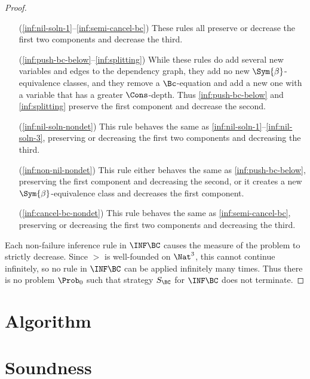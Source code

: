 \begin{proof}
    \begin{itemize}[align=left]
        \item[(\ref{inf:nil-soln-1}--\ref{inf:semi-cancel-bc})] These rules all
            preserve or decrease the first two components and decrease the
            third.

        \item[(\ref{inf:push-bc-below}--\ref{inf:splitting})] While these rules
            do add several new variables and edges to the dependency graph,
            they add no new $\Sym{\beta}$-equivalence classes, and they remove
            a $\Bc$-equation and add a new one with a variable that has a
            greater $\Cons$-depth. Thus \ref{inf:push-bc-below} and
            \ref{inf:splitting} preserve the first component and decrease the
            second.

        \item[(\ref{inf:nil-soln-nondet})] This rule behaves the same as
            \ref{inf:nil-soln-1}--\ref{inf:nil-soln-3}, preserving or decreasing
            the first two components and decreasing the third.

        \item[(\ref{inf:non-nil-nondet})] This rule either behaves the same as
            \ref{inf:push-bc-below}, preserving the first component and
            decreasing the second, or it creates a new
            $\Sym{\beta}$-equivalence class and decreases the first component.

        \item[(\ref{inf:cancel-bc-nondet})] This rule behaves the same as
            \ref{inf:semi-cancel-bc}, preserving or decreasing the first two
            components and decreasing the third.
    \end{itemize}

    Each non-failure inference rule in $\INF\BC$ causes the measure of the
    problem to strictly decrease. Since $>$ is well-founded on $\Nat^3$,
    this cannot continue infinitely, so no rule in $\INF\BC$ can be applied
    infinitely many times. Thus there is no problem $\Prob_0$ such that
    strategy $S_\BC$ for $\INF\BC$ does not terminate.
\end{proof}

\section{Algorithm}\label{sec:bc-algorithm}

\section{Soundness}\label{sec:bc-soundness}

